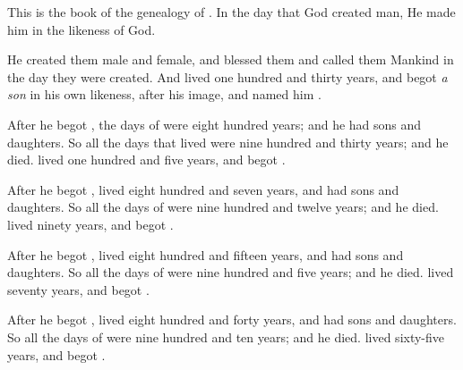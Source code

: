 

\bverse This is the book of the genealogy of \Adam. In the day that God created man, He made him in the likeness of God.

\bverse He created them male and female, and blessed them and called them Mankind in the day they were created.
\bverse And \Adam{} lived one hundred and thirty years, and begot \textit{a son} in his own likeness, after his image, and named him .

\bverse After he begot , the days of \Adam were eight hundred years; and he had sons and daughters.
\bverse So all the days that \Adam lived were nine hundred and thirty years; and he died.
\bverse {} lived one hundred and five years, and begot .
	
\bverse After he begot ,  lived eight hundred and seven years, and had sons and daughters.	
\bverse So all the days of  were nine hundred and twelve years; and he died.
\bverse {} lived ninety years, and begot .
	
\bverse After he begot ,  lived eight hundred and fifteen years, and had sons and daughters.	
\bverse So all the days of  were nine hundred and five years; and he died.
\bverse {} lived seventy years, and begot .
	
\bverse After he begot ,  lived eight hundred and forty years, and had sons and daughters.	
\bverse So all the days of  were nine hundred and ten years; and he died.
\bverse {} lived sixty-five years, and begot . 
	
